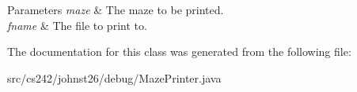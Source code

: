 \begin{DoxyParams}{Parameters}
{\em maze} & The maze to be printed. \\
\hline
{\em fname} & The file to print to. \\
\hline
\end{DoxyParams}


The documentation for this class was generated from the following file\-:\begin{DoxyCompactItemize}
\item 
src/cs242/johnst26/debug/Maze\-Printer.\-java\end{DoxyCompactItemize}
